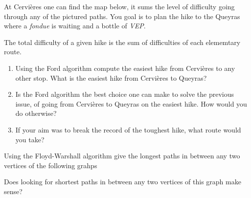 \documentclass[11pt,a4paper]{article}
\begin{document}
\begin{question}[subtitle={Along GR $58$}]
  At Cervières one can find the map below, it sums the level of
  difficulty going through any of the pictured paths. You goal is to
  plan the hike to the Queyras where a \emph{fondue} is waiting and a
  bottle of \emph{VEP}.
  
  The total difficulty of a given hike is the sum of difficulties of
  each elememtary route. 
  \begin{enumerate}
  \item Using the Ford algorithm compute the easiest hike from
    Cervières to any other stop. What is the easiest hike from
    Cervières to Queyras?
  \item Is the Ford algorithm the best choice one can make to solve
    the previous issue, of going from Cervières to Queyras on the
    easiest hike. How would you do otherwise?
  \item If your aim was to break the record of the toughest hike, what
    route would you take?
  \end{enumerate}
  
\end{question}

\begin{question}[subtitle={Shortest Path Problem}]
  Using the Floyd-Warshall algorithm give the longest paths in between
  any two vertices of the following grahps
    \begin{center}
  \end{center}
  Does looking for shortest paths in between any two vertices of this
  graph make sense?
\end{question}
\end{document}
